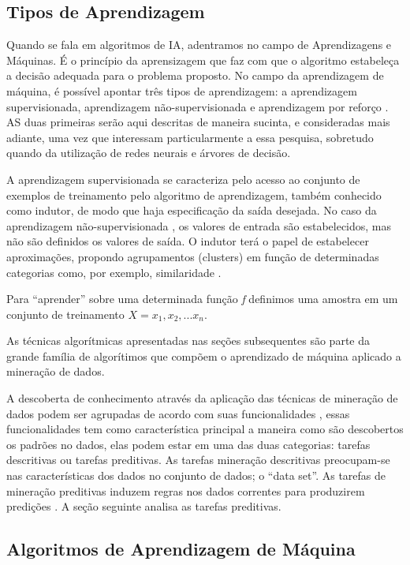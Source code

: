 \subsection{Tipos de Aprendizagem}

Quando se fala em algoritmos de IA, adentramos no campo de Aprendizagens e Máquinas. É o princípio da aprensizagem que faz com que o algoritmo estabeleça a decisão adequada para o problema proposto.
No campo da aprendizagem de máquina, é possível apontar três tipos de aprendizagem: a aprendizagem supervisionada, aprendizagem não-supervisionada e aprendizagem por reforço \cite{NorvigRussel2004}. AS duas primeiras serão aqui descritas de maneira sucinta, e consideradas mais adiante, uma vez que interessam particularmente a essa pesquisa, sobretudo quando da utilização de redes neurais e árvores de decisão. 

A aprendizagem supervisionada \cite{Monard} se caracteriza pelo acesso ao conjunto de exemplos de treinamento pelo algoritmo de aprendizagem, também conhecido como indutor, de modo que haja especificação da saída desejada.
No caso da aprendizagem não-supervisionada \cite{NorvigRussel2004}, os valores de entrada são estabelecidos, mas não são definidos os valores de saída. O indutor terá o papel de estabelecer aproximações, propondo agrupamentos (clusters) em função de determinadas categorias como, por exemplo, similaridade \cite{Monard}.

Para ``aprender'' sobre uma determinada função \textit{f} definimos uma amostra em um conjunto de treinamento $X = {x_{1}, x_{2}, ...x_{n}}$.

As técnicas algorítmicas apresentadas nas seções subsequentes são parte da grande família de algorítimos que compõem 
o aprendizado de máquina aplicado a mineração de dados.

A descoberta de conhecimento através da aplicação das técnicas de mineração de dados podem ser agrupadas de acordo com suas funcionalidades \cite{DataMining2}, 
essas funcionalidades tem como característica principal a maneira como são descobertos os padrões no dados, elas podem estar 
em uma das duas categorias: tarefas descritivas ou tarefas preditivas. As tarefas mineração descritivas preocupam-se nas características 
dos dados no conjunto de dados; o ``data set''. As tarefas de mineração preditivas induzem regras nos dados correntes para produzirem 
predições \cite{DataMining2}. A seção seguinte analisa as tarefas preditivas.



\subsection{Algoritmos de Aprendizagem de Máquina}

